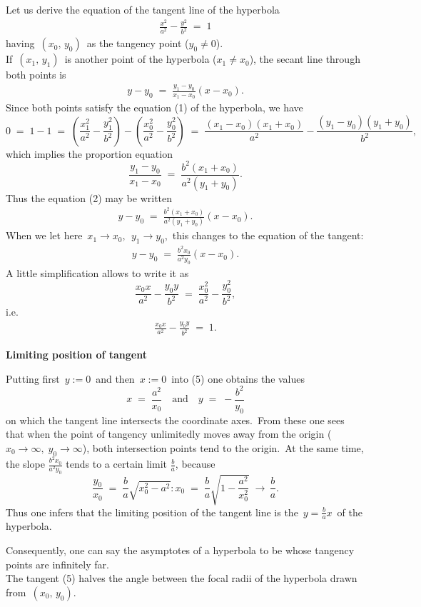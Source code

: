 \documentclass[12pt]{article}
\theoremstyle{definition}
\begin{document}

Let us derive the equation of the tangent line of the hyperbola
\begin{align}
\frac{x^2}{a^2}-\frac{y^2}{b^2} \;=\; 1
\end{align}
having\, $(x_0,\,y_0)$\, as the tangency point ($y_0 \neq 0$).\\



If\, $(x_1,\,y_1)$\, is another point of the hyperbola ($x_1 \neq x_0$), the secant line through both points is
\begin{align}
y\!-\!y_0 \;=\; \frac{y_1\!-\!y_0}{x_1\!-\!x_0}(x\!-\!x_0).
\end{align}
Since both points satisfy the equation (1) of the hyperbola, we have
$$0 \;=\; 1\!-\!1 
\;=\; \left(\frac{x_1^2}{a^2}-\frac{y_1^2}{b^2}\right)-\left(\frac{x_0^2}{a^2}-\frac{y_0^2}{b^2}\right)
\;=\; \frac{(x_1\!-\!x_0)(x_1\!+\!x_0)}{a^2}-\frac{(y_1\!-\!y_0)(y_1\!+\!y_0)}{b^2},$$
which implies the proportion equation
$$\frac{y_1\!-\!y_0}{x_1\!-\!x_0} \;=\; \frac{b^2(x_1\!+\!x_0)}{a^2(y_1\!+\!y_0)}.$$
Thus the  equation (2) may be written
\begin{align}
y\!-\!y_0 \;=\; \frac{b^2(x_1\!+\!x_0)}{a^2(y_1\!+\!y_0)}(x\!-\!x_0).
\end{align}
When we let here\, $x_1 \to x_0, \;\, y_1 \to y_0$,\, this changes to the equation of the tangent:
\begin{align}
y\!-\!y_0 \;=\; \frac{b^2x_0}{a^2y_0}(x\!-\!x_0).
\end{align}
A little simplification allows to write it as
$$\frac{x_0x}{a^2}-\frac{y_0y}{b^2} \;=\; \frac{x_0^2}{a^2}-\frac{y_0^2}{b^2},$$
i.e. 
\begin{align}
\frac{x_0x}{a^2}-\frac{y_0y}{b^2} \;=\; 1.
\end{align}

\textbf{Limiting position of tangent}

Putting first\, $y := 0$\, and then\, $x := 0$\, into (5) one obtains the values 
$$x \;=\; \frac{a^2}{x_0} \quad \mbox{and} \quad y \;=\; -\frac{b^2}{y_0}$$
on which the tangent line intersects the coordinate axes.\, From these one sees that when the point of tangency unlimitedly moves away from the origin ($x_0 \to \infty,\; y_0 \to \infty$), both intersection points tend to the origin.\, At the same time, the slope $\frac{b^2x_0}{a^2y_0}$ tends to a certain limit $\frac{b}{a}$, because
$$\frac{y_0}{x_0} \;=\; \frac{b}{a}\sqrt{x_0^2\!-\!a^2}:x_0 
\;=\; \frac{b}{a}\sqrt{1\!-\!\frac{a^2}{x_0^2}}\; \longrightarrow\,\frac{b}{a}.$$
Thus one infers that the limiting position of the tangent line is the  \,$y = \frac{b}{a}x$\, of the hyperbola.

Consequently, one can say the asymptotes of a hyperbola to be  whose tangency points are infinitely far.\\


The tangent (5) halves the angle between the focal radii of the hyperbola drawn from\, $(x_0,\,y_0)$.

\end{document}
